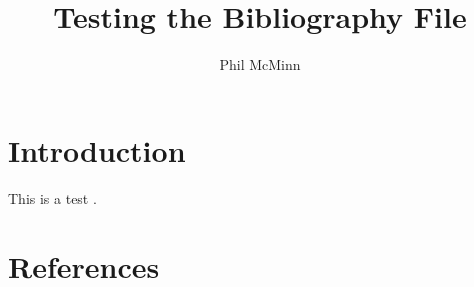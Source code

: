 \documentclass{article}
\begin{document}
\title{Testing the Bibliography File}
\author{Phil McMinn}
\maketitle

\section{Introduction}
This is a test \cite{McMinn2007}.

\section{References}


\end{document}
